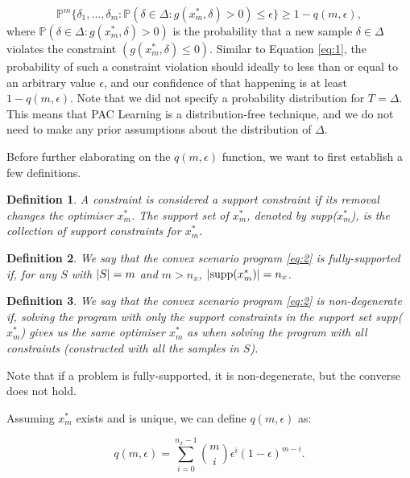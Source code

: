 \documentclass[11pt]{article}
\newtheorem{theorem}{Definition}
\begin{document}
\begin{equation}
	\label{eq:3}
	\mathbb{P}^{m} \{\delta_{1},...,\delta_{m}: \mathbb{P}(\delta \in \Delta: g(x^{*}_{m},\delta) > 0) \leq \epsilon \} \geq 1 - q(m,\epsilon),
\end{equation}
where $\mathbb{P}(\delta \in \Delta: g(x^{*}_{m},\delta) > 0)$ is the probability that a new sample $\delta\in \Delta$ violates the constraint $(g(x^{*}_{m},\delta) \leq 0)$. Similar to Equation \ref{eq:1}, the probability of such a constraint violation should ideally to less than or equal to an arbitrary value $\epsilon$, and our confidence of that happening is at least $1 - q(m,\epsilon)$. Note that we did not specify a probability distribution for $T=\Delta$. This means that PAC Learning is a distribution-free technique, and we do not need to make any prior assumptions about the distribution of $\Delta$.

Before further elaborating on the $q(m,\epsilon)$ function, we want to first establish a few definitions.


\begin{theorem}
	A constraint is considered a support constraint if its removal changes the optimiser $x^{*}_{m}$. The support set of $x^{*}_{m}$, denoted by supp($x^{*}_{m}$), is the collection of support constraints for $x^{*}_{m}$.
\end{theorem}

\begin{theorem}
\label{fullysupport}
	We say that the convex scenario program \ref{eq:2} is fully-supported if, for any $S$ with $\abs{S} = m$ and $m > n_{x}$, $\abs{\text{supp}(x^{*}_{m})} = n_{x}$.
\end{theorem}

\begin{theorem}
	We say that the convex scenario program \ref{eq:2} is non-degenerate if, solving the program with only the support constraints in the support set supp($x^{*}_{m}$) gives us the same optimiser $x^{*}_{m}$ as when solving the program with all constraints (constructed with all the samples in $S$).
\end{theorem}

Note that if a problem is fully-supported, it is non-degenerate, but the converse does not hold.

Assuming $x^{*}_{m}$ exists and is unique, we can define $q(m,\epsilon)$ as:

\begin{equation}
	\label{eq:4}
	q(m,\epsilon) = \sum_{i=0}^{n_{x}-1}{\binom{m}{i}}\epsilon^{i}(1-\epsilon)^{m-i}.
\end{equation}
\end{document}
